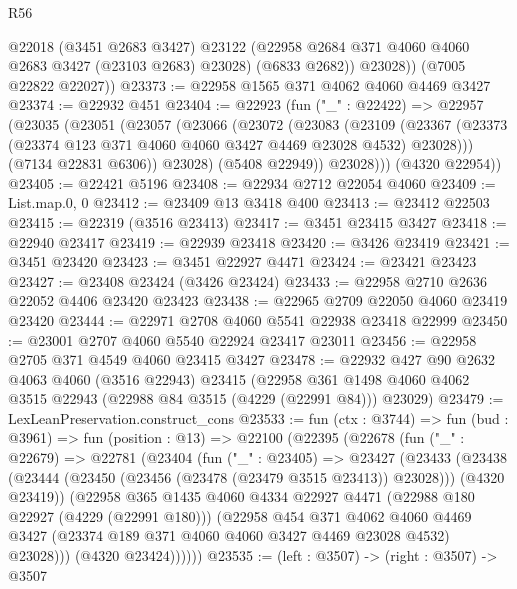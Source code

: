 \begin{lexlean}{R56}
\begin{coremodule}
            @22018
            (@3451 @2683 @3427)
            @23122
            (@22958 @2684 @371 @4060 @4060 @2683 @3427 (@23103 @2683) @23028)
            (@6833 @2682))
          @23028))
      (@7005 @22822 @22027))
@23373 := @22958 @1565 @371 @4062 @4060 @4469 @3427
@23374 := @22932 @451
@23404 := @22923
    (fun ("_" : @22422) =>
    @22957
      (@23035
        (@23051
          (@23057
            (@23066
              (@23072
                (@23083
                  (@23109
                    (@23367
                      (@23373 (@23374 @123 @371 @4060 @4060 @3427 @4469 @23028 @4532) @23028)))
                  (@7134 @22831 @6306))
                @23028)
              (@5408 @22949))
            @23028)))
      (@4320 @22954))
@23405 := @22421 @5196
@23408 := @22934 @2712 @22054 @4060
@23409 := List.map.{0, 0}
@23412 := @23409 @13 @3418 @400
@23413 := @23412 @22503
@23415 := @22319 (@3516 @23413)
@23417 := @3451 @23415 @3427
@23418 := @22940 @23417
@23419 := @22939 @23418
@23420 := @3426 @23419
@23421 := @3451 @23420
@23423 := @3451 @22927 @4471
@23424 := @23421 @23423
@23427 := @23408 @23424 (@3426 @23424)
@23433 := @22958 @2710 @2636 @22052 @4406 @23420 @23423
@23438 := @22965 @2709 @22050 @4060 @23419 @23420
@23444 := @22971 @2708 @4060 @5541 @22938 @23418 @22999
@23450 := @23001 @2707 @4060 @5540 @22924 @23417 @23011
@23456 := @22958 @2705 @371 @4549 @4060 @23415 @3427
@23478 := @22932
    @427
    @90
    @2632
    @4063
    @4060
    (@3516 @22943)
    @23415
    (@22958 @361 @1498 @4060 @4062 @3515 @22943 (@22988 @84 @3515 (@4229 (@22991 @84))) @23029)
@23479 := LexLeanPreservation.construct_cons
@23533 := fun (ctx : @3744) =>
  fun (bud : @3961) =>
  fun (position : @13) =>
  @22100
    (@22395
      (@22678
        (fun ("_" : @22679) =>
        @22781
          (@23404
            (fun ("_" : @23405) =>
            @23427
              (@23433
                (@23438
                  (@23444 (@23450 (@23456 (@23478 (@23479 @3515 @23413)) @23028)))
                  (@4320 @23419))
                (@22958
                  @365
                  @1435
                  @4060
                  @4334
                  @22927
                  @4471
                  (@22988 @180 @22927 (@4229 (@22991 @180)))
                  (@22958
                    @454
                    @371
                    @4062
                    @4060
                    @4469
                    @3427
                    (@23374 @189 @371 @4060 @4060 @3427 @4469 @23028 @4532)
                    @23028)))
              (@4320 @23424))))))
@23535 := (left : @3507) -> (right : @3507) -> @3507

\end{coremodule}
\end{lexlean}
